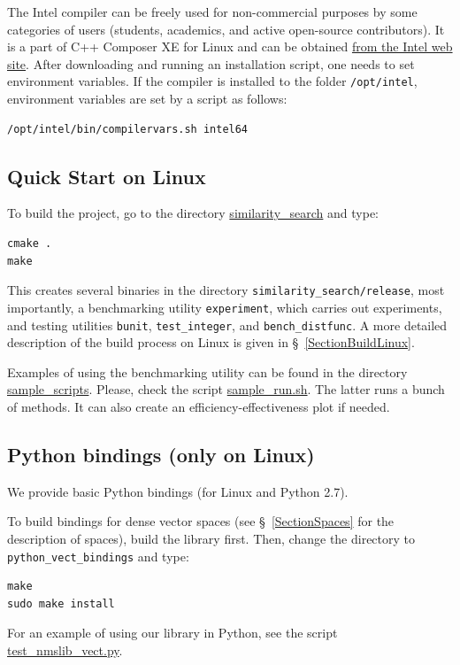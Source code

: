 \documentclass[runningheads,a4paper]{llncs}
\newcommand{\replocdir}{https://github.com/searchivarius/NonMetricSpaceLib/tree/pserv}
\newcommand{\replocfile}{https://github.com/searchivarius/NonMetricSpaceLib/blob/pserv/}
\newcommand{\ttt}[1]{\texttt{#1}}
\begin{document}
{The Intel compiler can be freely used for non-commercial purposes by some categories of users (students, academics,
and active open-source contributors).
It is a part of C++ Composer XE for Linux and can 
be obtained \href{http://software.intel.com/en-us/non-commercial-software-development}{from the Intel web site}.
After downloading and running an installation script, one needs to set environment variables.
If the compiler is installed to the folder \ttt{/opt/intel}, environment variables
are set by a script as follows:
\begin{verbatim}
/opt/intel/bin/compilervars.sh intel64
\end{verbatim}



\subsection{Quick Start on Linux}\label{QuickStartLinux}
To build the project, go to the directory \href{\replocdir similarity_search}{similarity\_search} and type:  
\begin{verbatim}
cmake .  
make   
\end{verbatim}
This creates several binaries in the directory \ttt{similarity\_search/release}, 
most importantly, 
a benchmarking utility \ttt{experiment}, which carries out experiments,
and testing utilities \ttt{bunit}, \ttt{test\_integer}, and \ttt{bench\_distfunc}.
A more detailed description of the build process on Linux is given in \S~\ref{SectionBuildLinux}.

Examples of using the benchmarking utility can be found in the directory \href{\replocdir sample_scripts}{sample\_scripts}. 
Please, check the script \href{\replocfile sample_scripts/sample_run.sh}{sample\_run.sh}. 
The latter runs a bunch of methods. It can also create an efficiency-effectiveness plot if needed.



\subsection{Python bindings (only on Linux)}
We provide basic Python bindings (for Linux and Python 2.7). 


To build bindings for dense vector spaces (see \S~\ref{SectionSpaces} for the description of spaces), build the library first.
Then, change the directory to \ttt{python\_vect\_bindings} and type:
\begin{verbatim}
make
sudo make install
\end{verbatim} 
For an example of using our library in Python, see the script  \href{\replocfile python_vect_bindings/test_nmslib_vect.py}{test\_nmslib\_vect.py}.

}
\end{document}

